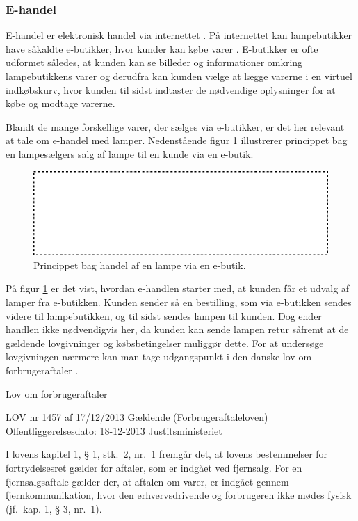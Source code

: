 \subsubsection{E-handel}
\label{sec:ehandel}
E-handel er elektronisk handel via internettet \cite{ddo_ehandel}. På internettet kan lampebutikker have såkaldte e-butikker, hvor kunder kan købe varer \cite{ddo_ebutik}. E-butikker er ofte udformet således, at kunden kan se billeder og informationer omkring lampebutikkens varer og derudfra kan kunden vælge at lægge varerne i en virtuel indkøbskurv, hvor kunden til sidst indtaster de nødvendige oplysninger for at købe og modtage varerne.

Blandt de mange forskellige varer, der sælges via e-butikker, er det her relevant at tale om e-handel med lamper. Nedenstående figur \ref{fig:e_handel_med_lamper} illustrerer princippet bag en lampesælgers salg af lampe til en kunde via en e-butik.

\begin{figure}[H]
  \includegraphics{e_handel_med_lampe.pdf}
  \caption{Princippet bag handel af en lampe via en e-butik.}
    \label{fig:e_handel_med_lamper}
\end{figure}

På figur \ref{fig:e_handel_med_lamper} er det vist, hvordan e-handlen starter med, at kunden får et udvalg af lamper fra e-butikken. Kunden sender så en bestilling, som via e-butikken sendes videre til lampebutikken, og til sidst sendes lampen til kunden. Dog ender handlen ikke nødvendigvis her, da kunden kan sende lampen retur såfremt at de gældende lovgivninger og købsbetingelser muliggør dette. For at undersøge lovgivningen nærmere kan man tage udgangspunkt i den danske lov om forbrugeraftaler \cite{retsinformationen}.

%
Lov om forbrugeraftaler

LOV nr 1457 af 17/12/2013 Gældende
(Forbrugeraftaleloven)
Offentliggørelsesdato: 18-12-2013
Justitsministeriet
%

I lovens kapitel 1, § 1, stk.\ 2, nr.\ 1 fremgår det, at lovens bestemmelser for fortrydelsesret gælder for aftaler, som er indgået ved fjernsalg. For en  fjernsalgsaftale gælder der, at aftalen om varer, er indgået gennem fjernkommunikation, hvor den erhvervsdrivende og forbrugeren ikke mødes fysisk (jf.\ kap. 1, § 3, nr.\ 1).

